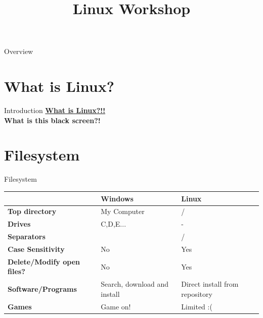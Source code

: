 \documentclass[11pt]{beamer}
\title{Linux Workshop}
\begin{document}
\begin{frame}
\titlepage
\end{frame}

\begin{frame}{Overview}
\tableofcontents
\end{frame}

\section{What is Linux?}
\begin{frame}{Introduction}
\textbf{\Huge \href{https://www.youtube.com/watch?v=yVpbFMhOAwE}{What is Linux?!!}}\\
\vspace{20pt}
\textbf{\Huge What is this black screen?!}
\end{frame}

\section{Filesystem}
\begin{frame}{Filesystem}
\begin{center}
\begin{tabular}{|p{3.5cm}|p{3cm}|p{3cm}|}
\hline 
 & \textbf{Windows} & \textbf{Linux} \\ 
\hline 
\textbf{Top directory} & My Computer & / \\ 
\hline 
\textbf{Drives} & C,D,E... & - \\ 
\hline 
\textbf{Separators} & \ & / \\ 
\hline 
\textbf{Case Sensitivity} & No & Yes \\ 
\hline 
\textbf{Delete/Modify open files?} & No & Yes \\ 
\hline 
\textbf{Software/Programs} & Search, download  and install & Direct install from repository \\
\hline 
\textbf{Games} & Game on! & Limited :( \\
\hline 
\end{tabular}
\end{center}
\end{frame}
\end{document}
